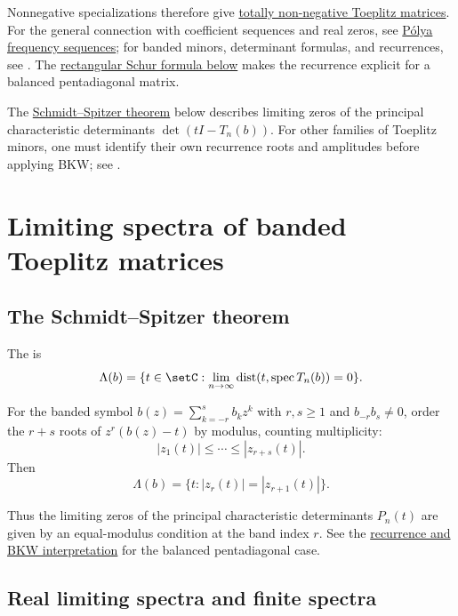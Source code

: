 Nonnegative specializations therefore give
\hyperref[pfSchurJacobiTrudi]{totally non-negative Toeplitz matrices}.
For the general connection with coefficient sequences and real zeros, see
\hyperref[polyaFrequency]{Pólya frequency sequences};
for banded minors, determinant formulas, and recurrences, see
\cite{Alexandersson2012Toeplitz}.
The \hyperref[toeplitzReciprocalRecurrence]{rectangular Schur formula below}
makes the recurrence explicit for a balanced pentadiagonal matrix.

The \hyperref[toeplitzSchmidtSpitzer]{Schmidt--Spitzer theorem} below
describes limiting zeros of the principal characteristic determinants
$\det(tI-T_n(b))$. For other families of Toeplitz minors, one must identify
their own recurrence roots and amplitudes before applying BKW;
see \cite{Alexandersson2012Toeplitz}.

\section[toeplitzSpectra]{Limiting spectra of banded Toeplitz matrices}

\subsection[toeplitzSchmidtSpitzer]{The Schmidt--Spitzer theorem}

The  is
\[
 \Lambda(b)=\{t\in\setC:\lim_{n\to\infty}
 \operatorname{dist}(t,\operatorname{spec}T_n(b))=0\}.
\]
\begin{theorem}
For the banded symbol $b(z)=\sum_{k=-r}^s b_kz^k$ with
$r,s\geq1$ and $b_{-r}b_s\ne0$, order the $r+s$ roots of
$z^r(b(z)-t)$ by modulus, counting multiplicity:
\[
 |z_1(t)|\leq\dotsb\leq|z_{r+s}(t)|.
\]
Then
\[
 \Lambda(b)=\{t:|z_r(t)|=|z_{r+1}(t)|\}.
\]
\end{theorem}

Thus the limiting zeros of the principal characteristic determinants
$P_n(t)$ are given by an equal-modulus condition at the band index $r$.
See the \hyperref[toeplitzReciprocalRecurrence]{recurrence and BKW interpretation}
for the balanced pentadiagonal case.

\subsection[toeplitzRealLimitQuestion]{Real limiting spectra and finite spectra}

